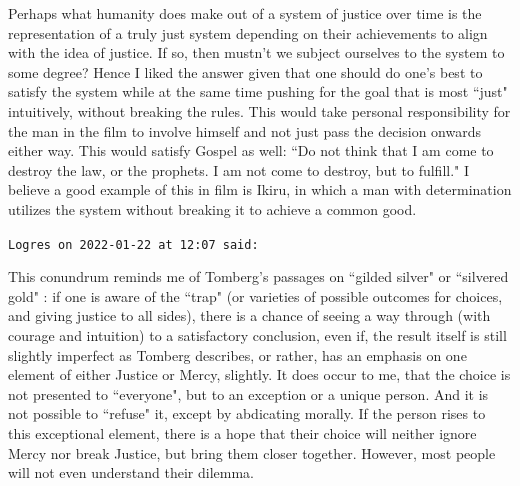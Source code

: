 \begin{footnotesize}
\begin{sffamily}
Perhaps what humanity does make out of a system of justice over time is the representation of a truly just system depending on their achievements to align with the idea of justice. If so, then mustn't we subject ourselves to the system to some degree? Hence I liked the answer given that one should do one's best to satisfy the system while at the same time pushing for the goal that is most ``just" intuitively, without breaking the rules. This would take personal responsibility for the man in the film to involve himself and not just pass the decision onwards either way. This would satisfy Gospel as well: ``Do not think that I am come to destroy the law, or the prophets. I am not come to destroy, but to fulfill." I believe a good example of this in film is Ikiru, in which a man with determination utilizes the system without breaking it to achieve a common good.


\hfill

\texttt{Logres on 2022-01-22 at 12:07 said: }

This conundrum reminds me of Tomberg's passages on ``gilded silver" or ``silvered gold" : if one is aware of the ``trap" (or varieties of possible outcomes for choices, and giving justice to all sides), there is a chance of seeing a way through (with courage and intuition) to a satisfactory conclusion, even if, the result itself is still slightly imperfect as Tomberg describes, or rather, has an emphasis on one element of either Justice or Mercy, slightly. It does occur to me, that the choice is not presented to ``everyone", but to an exception or a unique person. And it is not possible to ``refuse" it, except by abdicating morally. If the person rises to this exceptional element, there is a hope that their choice will neither ignore Mercy nor break Justice, but bring them closer together. However, most people will not even understand their dilemma.


\end{sffamily}\end{footnotesize}
